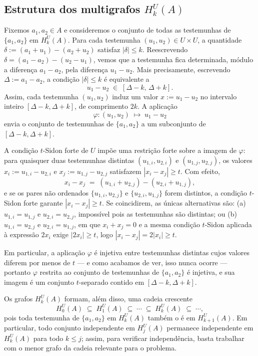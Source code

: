 \documentclass[reqno,a4paper,12pt]{amsart}
\begin{document}
\subsection{Estrutura dos multigrafos $H_k^U(A)$}

Fixemos $a_1, a_2 \in A$ e consideremos o conjunto de todas as testemunhas de $\{a_1,a_2\}$
em $H_k^U(A)$. Para cada testemunha $(u_1,u_2) \in U \times U$, a quantidade
$\delta := (a_1 + u_1) - (a_2 + u_2)$ satisfaz $|\delta| \leq k$. Reescrevendo
$\delta = (a_1 - a_2) - (u_2 - u_1)$, vemos que a testemunha fica determinada, módulo a
diferença $a_1 - a_2$, pela diferença $u_1 - u_2$. Mais precisamente, escrevendo
$\Delta := a_1 - a_2$, a condição $|\delta| \leq k$ é equivalente a
\[
  u_1 - u_2 \;\in\; [\Delta - k,\, \Delta + k].
\]
Assim, cada testemunha $(u_1,u_2)$ induz um valor $x := u_1 - u_2$ no intervalo inteiro
$[\Delta - k, \Delta + k]$, de comprimento $2k$. A aplicação
\[
  \varphi \colon (u_1, u_2) \;\longmapsto\; u_1 - u_2
\]
envia o conjunto de testemunhas de $\{a_1,a_2\}$ a um subconjunto de $[\Delta - k, \Delta + k]$.

A condição $t$-Sidon forte de $U$ impõe uma restrição forte sobre a imagem de $\varphi$: para
quaisquer duas testemunhas distintas $(u_{1,i}, u_{2,i})$ e $(u_{1,j}, u_{2,j})$, os valores
$x_i := u_{1,i} - u_{2,i}$ e $x_j := u_{1,j} - u_{2,j}$ satisfazem $|x_i - x_j| \geq t$.
Com efeito,
\[
  x_i - x_j \;=\; (u_{1,i} + u_{2,j}) - (u_{2,i} + u_{1,j}),
\]
e se os pares não ordenados $\{u_{1,i}, u_{2,j}\}$ e $\{u_{2,i}, u_{1,j}\}$ forem distintos,
a condição $t$-Sidon forte garante $|x_i - x_j| \geq t$. Se coincidirem, as únicas
alternativas são: (a) $u_{1,i} = u_{1,j}$ e $u_{2,i} = u_{2,j}$, impossível pois as
testemunhas são distintas; ou (b) $u_{1,i} = u_{2,j}$ e $u_{2,i} = u_{1,j}$, em que
$x_i + x_j = 0$ e a mesma condição $t$-Sidon aplicada à expressão $2x_i$ exige
$|2x_i| \geq t$, logo $|x_i - x_j| = 2|x_i| \geq t$.

Em particular, a aplicação $\varphi$ é injetiva entre testemunhas distintas cujos valores
diferem por menos de $t$ — e como acabamos de ver, isso nunca ocorre — portanto $\varphi$
restrita ao conjunto de testemunhas de $\{a_1,a_2\}$ é injetiva, e sua imagem é um conjunto
$t$-separado contido em $[\Delta - k, \Delta + k]$.

Os grafos $H_k^U(A)$ formam, além disso, uma cadeia crescente
\[
  H_0^U(A) \;\subseteq\; H_1^U(A) \;\subseteq\; \cdots \;\subseteq\; H_k^U(A) \;\subseteq\; \cdots,
\]
pois toda testemunha de $\{a_1,a_2\}$ em $H_k^U(A)$ também o é em $H_{k+1}^U(A)$. Em
particular, todo conjunto independente em $H_j^U(A)$ permanece independente em $H_k^U(A)$
para todo $k \leq j$; assim, para verificar independência, basta trabalhar com o menor grafo
da cadeia relevante para o problema.
\end{document}
